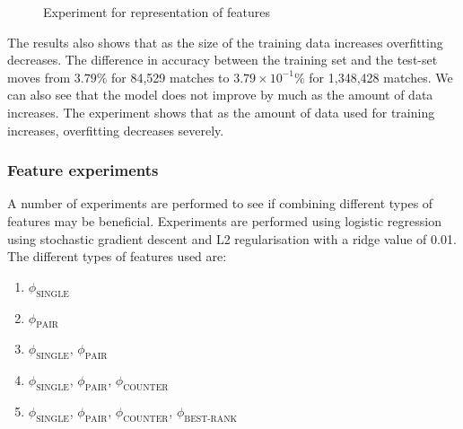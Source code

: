 \begin{figure}[!htb]
  \centering
{}
  \caption{Experiment for representation of features}\label{fig:clusterbigdata}
\end{figure}

The results also shows that as the size of the training data increases overfitting decreases. The difference in accuracy between the training set and the test-set moves from $3.79\%$ for 84,529 matches to $3.79\times10^{-1} \%$ for 1,348,428 matches. We can also see that the model does not improve by much as the amount of data increases. The experiment shows that as the amount of data used for training increases, overfitting decreases severely. 



\subsubsection{Feature experiments}\label{sec:feattest}
A number of experiments are performed to see if combining different types of features may be beneficial.
Experiments are performed using logistic regression using stochastic gradient descent and L2 regularisation with a ridge value of 0.01. The different types of features used are:
\begin{enumerate}
\item $\phi_\text{SINGLE}$
\item $\phi_\text{PAIR}$
\item $\phi_\text{SINGLE}$, $\phi_\text{PAIR}$
\item $\phi_\text{SINGLE}$, $\phi_\text{PAIR}$, $\phi_\text{COUNTER}$
\item $\phi_\text{SINGLE}$, $\phi_\text{PAIR}$, $\phi_\text{COUNTER}$, $\phi_\text{BEST-RANK}$
\end{enumerate}

